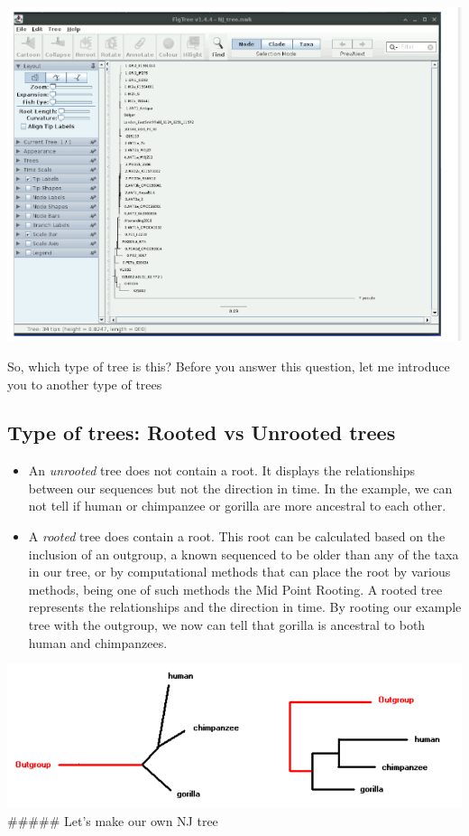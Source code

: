 \documentclass[
  letterpaper,
]{book}
\providecommand{\tightlist}{%
  \setlength{\itemsep}{0pt}\setlength{\parskip}{0pt}}\usepackage{longtable,booktabs,array}
\begin{document}
\includegraphics{assets/images/chapters/phylogenomics/11.png}

So, which type of tree is this? Before you answer this question, let me
introduce you to another type of trees

\hypertarget{type-of-trees-rooted-vs-unrooted-trees}{%
\subsection{Type of trees: Rooted vs Unrooted
trees}\label{type-of-trees-rooted-vs-unrooted-trees}}

\begin{itemize}
\tightlist
\item
  An \emph{unrooted} tree does not contain a root. It displays the
  relationships between our sequences but not the direction in time. In
  the example, we can not tell if human or chimpanzee or gorilla are
  more ancestral to each other.
\item
  A \emph{rooted} tree does contain a root. This root can be calculated
  based on the inclusion of an outgroup, a known sequenced to be older
  than any of the taxa in our tree, or by computational methods that can
  place the root by various methods, being one of such methods the Mid
  Point Rooting. A rooted tree represents the relationships and the
  direction in time. By rooting our example tree with the outgroup, we
  now can tell that gorilla is ancestral to both human and chimpanzees.
\end{itemize}

\includegraphics{assets/images/chapters/phylogenomics/12.png} \#\#\#\#\#
Let's make our own NJ tree
\end{document}
